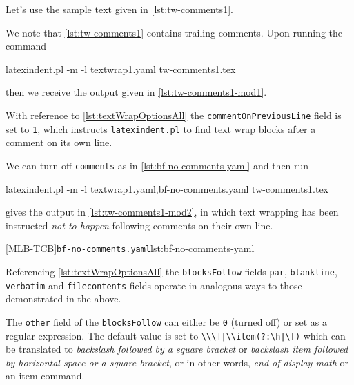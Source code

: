  \begin{example}
 Let's use the sample text given in \cref{lst:tw-comments1}. 


 We note that \cref{lst:tw-comments1} contains trailing comments. Upon running the
 command

 \begin{commandshell}
latexindent.pl -m -l textwrap1.yaml tw-comments1.tex
\end{commandshell}

 then we receive the output given in \cref{lst:tw-comments1-mod1}.


 With reference to \vref{lst:textWrapOptionsAll} the \texttt{commentOnPreviousLine} field
 is set to \texttt{1}, which instructs \texttt{latexindent.pl} to find text wrap blocks
 after a comment on its own line.

 We can turn off \texttt{comments} as in \cref{lst:bf-no-comments-yaml} and then run

 \begin{commandshell}
latexindent.pl -m -l textwrap1.yaml,bf-no-comments.yaml tw-comments1.tex
\end{commandshell}

 gives the output in \cref{lst:tw-comments1-mod2}, in which text wrapping has been
 instructed \emph{not to happen} following comments on their own line.
 \begin{cmhtcbraster}[raster column skip=.1\linewidth,
   raster left skip=-3.5cm,
   raster right skip=-2cm,
  ]
  [MLB-TCB]{\texttt{bf-no-comments.yaml}}{lst:bf-no-comments-yaml}
 \end{cmhtcbraster}
 \end{example}

 Referencing \vref{lst:textWrapOptionsAll} the \texttt{blocksFollow} fields \texttt{par},
 \texttt{blankline}, \texttt{verbatim} and \texttt{filecontents} fields operate in
 analogous ways to those demonstrated in the above.

 The \texttt{other} field of the \texttt{blocksFollow} can either be \texttt{0} (turned
 off) or set as a regular expression. The default value is set to
 \lstinline!\\\]|\\item(?:\h|\[)! which can be translated to \emph{backslash followed by
 a square bracket} or \emph{backslash item followed by horizontal space or a square
 bracket}, or in other words, \emph{end of display math} or an item command.

